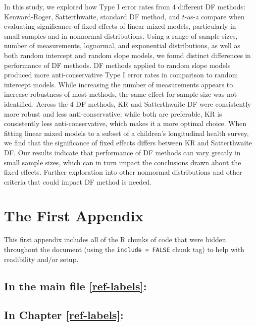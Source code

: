 \documentclass[12pt, twoside]{amherstthesis}
\begin{document}
In this study, we explored how Type I error rates from 4 different DF methods: Kenward-Roger, Satterthwaite, standard DF method, and \(t\)-as-\(z\) compare when evaluating significance of fixed effects of linear mixed models, particularly in small samples and in nonnormal distributions. Using a range of sample sizes, number of measurements, lognormal, and exponential distributions, as well as both random intercept and random slope models, we found distinct differences in performance of DF methods. DF methods applied to random slope models produced more anti-conservative Type I error rates in comparison to random intercept models. While increasing the number of measurements appears to increase robustness of most methods, the same effect for sample size was not identified. Across the 4 DF methods, KR and Satterthwaite DF were consistently more robust and less anti-conservative; while both are preferable, KR is consistently less anti-conservative, which makes it a more optimal choice. When fitting linear mixed models to a subset of a children's longitudinal health survey, we find that the significance of fixed effects differs between KR and Satterthwaite DF. Our results indicate that performance of DF methods can vary greatly in small sample sizes, which can in turn impact the conclusions drawn about the fixed effects. Further exploration into other nonnormal distributions and other criteria that could impact DF method is needed.

\appendix

\hypertarget{the-first-appendix}{%
\chapter{The First Appendix}\label{the-first-appendix}}

This first appendix includes all of the R chunks of code that were hidden throughout the document (using the \texttt{include\ =\ FALSE} chunk tag) to help with readibility and/or setup.

\hypertarget{in-the-main-file-refref-labels}{%
\section{In the main file \ref{ref-labels}:}\label{in-the-main-file-refref-labels}}

\hypertarget{in-chapter-refref-labels}{%
\section{In Chapter \ref{ref-labels}:}\label{in-chapter-refref-labels}}
\end{document}
